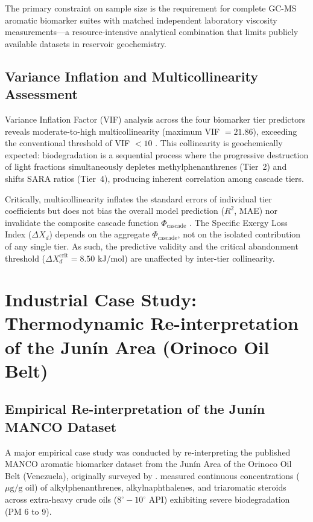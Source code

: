 \documentclass[review,12pt]{elsarticle}
\begin{document}
The primary constraint on sample size is the requirement for complete GC-MS aromatic biomarker suites with matched independent laboratory viscosity measurements---a resource-intensive analytical combination that limits publicly available datasets in reservoir geochemistry.

\subsection{Variance Inflation and Multicollinearity Assessment}
Variance Inflation Factor (VIF) analysis across the four biomarker tier predictors reveals moderate-to-high multicollinearity (maximum VIF $= 21.86$), exceeding the conventional threshold of VIF $< 10$ \citep{obrien2007vif}. This collinearity is geochemically expected: biodegradation is a sequential process where the progressive destruction of light fractions simultaneously depletes methylphenanthrenes (Tier~2) and shifts SARA ratios (Tier~4), producing inherent correlation among cascade tiers.

Critically, multicollinearity inflates the standard errors of individual tier coefficients but does not bias the overall model prediction ($R^2$, MAE) nor invalidate the composite cascade function $\Phi_{\text{cascade}}$ \citep{obrien2007vif}. The Specific Exergy Loss Index ($\Delta X_d$) depends on the aggregate $\Phi_{\text{cascade}}$, not on the isolated contribution of any single tier. As such, the predictive validity and the critical abandonment threshold ($\Delta X_d^{\text{crit}} = 8.50$ kJ/mol) are unaffected by inter-tier collinearity.

\section{Industrial Case Study: Thermodynamic Re-interpretation of the Junín Area (Orinoco Oil Belt)}

\subsection{Empirical Re-interpretation of the Junín MANCO Dataset}
A major empirical case study was conducted by re-interpreting the published MANCO aromatic biomarker dataset from the Junín Area of the Orinoco Oil Belt (Venezuela), originally surveyed by \citet{lopez2014biodegradation}. \citet{lopez2014biodegradation} measured continuous concentrations ($\mu\text{g/g oil}$) of alkylphenanthrenes, alkylnaphthalenes, and triaromatic steroids across extra-heavy crude oils ($8^\circ-10^\circ\text{ API}$) exhibiting severe biodegradation (PM 6 to 9).
\end{document}
